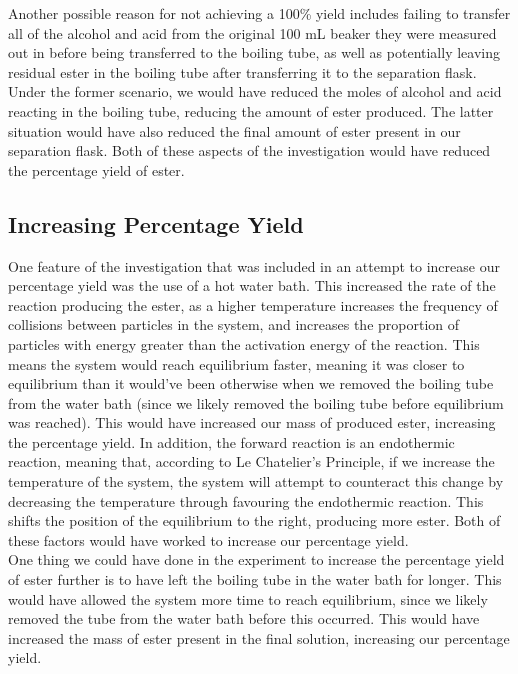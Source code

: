 \documentclass[a4paper,11pt]{article}
\begin{document}
Another possible reason for not achieving a 100\% yield includes failing to
transfer all of the
alcohol and acid from the original 100 mL beaker they were measured out in
before being
transferred to the boiling tube, as well as potentially leaving residual ester
in the boiling
tube after transferring it to the separation flask. Under the former scenario,
we would have reduced the moles of alcohol and acid reacting in the boiling
tube, reducing the amount of ester produced. The latter situation would have
also reduced the final amount of ester present in our separation flask. Both of
these aspects of the investigation would have reduced the percentage yield of
ester.


\subsection{Increasing Percentage Yield}

One feature of the investigation that was included in an attempt to increase our
percentage yield was the use of a hot water bath. This increased the rate of the
reaction producing the ester, as
a higher temperature increases the frequency of collisions between particles in
the system, and increases the proportion of particles with energy greater than
the activation energy of the reaction. This means the system would reach
equilibrium faster, meaning it was closer to equilibrium than it would've been
otherwise when we removed the boiling tube from the water bath (since we likely removed
the boiling tube before equilibrium was reached). This would have increased our
mass of produced ester, increasing the percentage yield. In addition, the
forward reaction is an
endothermic reaction, meaning that, according to Le Chatelier's Principle, if we
increase the temperature of the system, the system will attempt to counteract
this change by decreasing the temperature through favouring the endothermic
reaction. This shifts the position of
the equilibrium to the right, producing more ester. Both of these factors
would have worked to increase our percentage yield. \\

One thing we could have done in the experiment to increase the percentage yield of
ester further is to have left the boiling tube in the water bath for longer. This would
have allowed the system more time to reach equilibrium, since we likely removed
the tube from the water bath before this occurred. This would have increased the
mass of ester present in the final solution, increasing our percentage yield. \\
\end{document}
